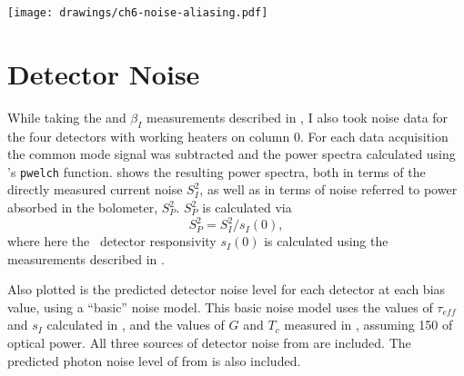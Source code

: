 \begin{figure*}
  \centering
\texttt{[image: drawings/ch6-noise-aliasing.pdf]}
\caption[Plots showing impact of noise aliasing]{
Plots showing impact of noise aliasing.
\textbf{Left}
Plot showing fractional excess noise (see text for definition) due to noise aliasing for all rows of column 0.
The error bars are for \SI{95}{\percent} confidence intervals, and the median excess noise is \SI{12}{\percent}.
\textbf{Right}
Sample power spectra at \SI{3125}{\hertz} and \SI{15625}{\hertz} for .
For this detector the excess noise is \SI{17}{\percent}.
}
\label{fig:ch6-noise-aliasing}
\end{figure*}

\section{Detector Noise} \label{sec:det-noise}

While taking the \Loop and $\beta_I$ measurements described in , I also took noise data for the four detectors with working heaters on column 0.
For each data acquisition the common mode signal was subtracted and the power spectra calculated using \MATLAB's \texttt{pwelch} function.
 shows the resulting power spectra, both in terms of the directly measured current noise $S^2_I$, as well as in terms of noise referred to power absorbed in the bolometer, $S^2_{P}$.
$S^2_{P}$ is calculated via
\begin{equation}
 S^2_{P} = S^2_I / s_I(0),
\end{equation}
where here the \DC\ detector responsivity $s_I(0)$ is calculated using the measurements described in .

Also plotted is the predicted detector noise level for each detector at each bias value, using a ``basic'' noise model.
This basic noise model uses the values of $\tau_{eff}$ and $s_I$ calculated in , and the values of $G$ and $T_c$ measured in , assuming \SI{150}{\pW} of optical power.
All three sources of detector noise from  are included.
The predicted photon noise level of  from  is also included.

